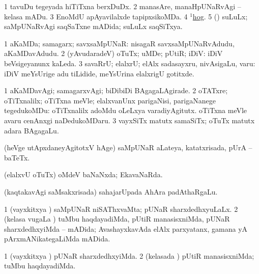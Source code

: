 \noindent 
\gl{\pagu}
\bmng
\bnum
\num{1}  tavuDu tegeyada hiTiTxna berxDuDx. 
\num{2}  manasAre, manaHpUNaRvAgi -- kelasa mADu. 
\num{3}  EnoMdU apAyavilalxde tapipxsikoMDa. 
\num{4}  \hyperref{kandict_h.pdf}{H}{hog(1) nuga(1)}{$^1$hog}. 
\num{5}  (\ame) suLuLx; saMpUNaRvAgi saqSaTxne mADida; suLuLx saqSiTxya. 
\enum
\emng
\eentry

\bentry
{} 
\gl{\nA}
\expl{}
\bmng
\bnum
\num{1} aKaMDa; samagarx; savxsaMpUNaR:  nisagaR savxsaMpUNaRvAdudu, aKaMDavAdudu. 
\num{2} (yAvudaradeV) oTuTx; uMDe; pUtiR; iDiV:  iDiV beVsigeyanunx kaLeda. 
\num{3} savaRrU; elalxrU; elAlx sadasayxru, nivAsigaLu, \mo varu:  iDiV meYsUrige adu tiLidide, meYsUrina elalxrigU gotitxde. 
\enum
\emng

\noindent
\gl{\pagu}
\expl{}
\bmng
\bnum
\num{1}  aKaMDavAgi; samagarxvAgi; biDibiDi BAgagaLAgirade. 
\num{2}  oTATxre; oTiTxnalilx; oTiTxna meVle; elalxvanUnx parigaNisi, parigaNanege tegedukoMDu:  oTiTxnalilx adoMdu oLeLxya varadiyAgitutx.  oTiTxna meVle avaru cenAnxgi naDedukoMDaru. 
\num{3}  vayxSiTx matutx samaSiTx; oTuTx matutx adara BAgagaLu. 
\enum
\emng
\eentry

\bentry
{}
\gl{\nA}
\bmng
(heVge utApxdaneyAgitotxV hAge) saMpUNaR aLateya, katatxrisada, pUrA -- baTeTx. 
\emng
\eentry

\bentry
{}
\gl{\gu}
\bmng
(elalxvU oTuTx) oMdeV baNaNxda; EkavaNaRda. 
\emng
\eentry

\bentry
{} 
\gl{\nA}
\expl{}
\bmng
(kaqtakavAgi saMsakxrisada) sahajarUpada AhAra padAthaRgaLu. 
\emng
\eentry

\bentry
{}
\gl{\gu}
\bmng
\bnum
\num{1} (vayxkitxya \vi) saMpUNaR niSAThxvaMta; pUNaR sharxdedhxyuLaLx. 
\num{2} (kelasa \mo vugaLa \vi) tuMbu haqdayadiMda, pUtiR manasisxniMda, pUNaR sharxdedhxyiMda -- mADida; AvashayxkavAda elAlx parxyatanx, gamana yA pArxmANikategaLiMda mADida. 
\enum
\emng
\eentry

\bentry
{}
\gl{\kirxvi}
\bmng
\bnum
\num{1} (vayxkitxya \vi) pUNaR sharxdedhxyiMda. 
\num{2} (kelasada \vi) pUtiR manasisxniMda; tuMbu haqdayadiMda. 
\enum
\emng
\eentry

